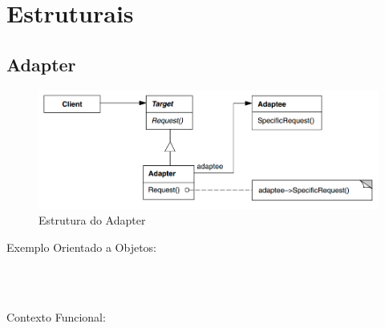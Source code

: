 \section{Estruturais}

\subsection{Adapter}

\begin{figure}[htb]
	\caption{\label{fig_grafico}Estrutura do Adapter}
	\begin{center}
	    \includegraphics[scale=0.5]{5_padroes-contexto-funcional/5.2_estruturais/5.2.1_adapter/diagram.png}
	\end{center}
\end{figure}

Exemplo Orientado a Objetos:

\begin{lstlisting}[caption={Adapter Orientado a Objetos},label=ooadapter]



\end{lstlisting}

Contexto Funcional:


\begin{lstlisting}[caption={Adapter Funcional},label=fpadapter]
    

    
\end{lstlisting}